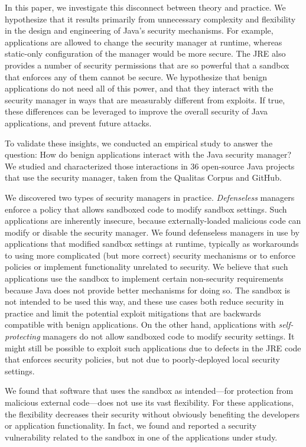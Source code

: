 \documentclass{sig-alternate-05-2015}
\begin{document}
In this paper, we investigate this disconnect between theory and practice. We
hypothesize that it results primarily from unnecessary complexity and flexibility
in the design and engineering of Java's security mechanisms. For example,
applications are allowed to change the security manager at runtime, whereas
static-only configuration of the manager would be more secure. The JRE also
provides a number of security permissions that are so powerful that a sandbox
that enforces any of them cannot be secure. We
hypothesize that benign applications do not need all of this power, and that
they interact with the security manager in ways
that are measurably different from exploits.
If true, these differences can be leveraged to improve the overall security of
Java applications, and prevent future attacks.


To validate these insights, we conducted an empirical study
to answer the question: How do benign
applications interact with the Java security manager? We studied and
characterized those interactions in 36
open-source Java projects that use the security manager, taken from the Qualitas
Corpus \cite{QualitasCorpus:APSEC:2010} and GitHub.


We discovered two types of security managers in
practice. \emph{Defenseless} managers enforce a policy that allows sandboxed code
to modify sandbox settings. Such applications
are inherently insecure, because externally-loaded malicious code can
modify or disable the security manager. We found defenseless managers in use
by applications that modified sandbox settings at runtime, typically
as workarounds to using more complicated (but more correct) security mechanisms
or to enforce policies or implement functionality
unrelated to security. We believe that such applications use the
sandbox to implement certain non-security requirements
because Java does not provide better mechanisms for doing so.
The sandbox is not intended to be used this way, and these use cases
both reduce security in practice and limit the potential exploit mitigations that are
backwards compatible with benign applications.
On the other hand, applications with \emph{self-protecting} managers do
not allow sandboxed code to modify security settings.
It might still be possible to exploit
such applications due to defects in the JRE code that enforces security
policies, but not due to poorly-deployed local security settings.


We found that
software that uses the sandbox as intended---for protection from malicious external code---does not use its
vast flexibility. For these applications, the flexibility decreases their security without
obviously benefiting the developers or application functionality. In fact, we found and reported a
security vulnerability related to the sandbox in one of the applications under study.
\end{document}
